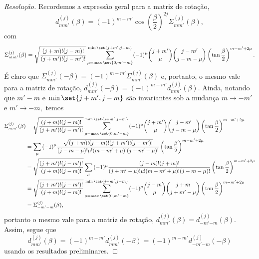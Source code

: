 \begin{proof}[Resolução]
   Recordemos a expressão geral para a matriz de rotação,
   \begin{equation*}
      d^{(j)}_{mm'}(\beta) = (-1)^{m - m'}  \cos\left(\frac\beta2\right)^{2j} \Sigma^{(j)}_{mm'}(\beta),
   \end{equation*}
   com
   \begin{equation*}
      \Sigma^{(j)}_{mm'}(\beta) = \sqrt{\frac{(j+m)!(j-m)!}{(j + m')!(j - m')!}}\sum_{\mu = \max\set{0,m' - m}}^{\min\set{j+m', j-m}} (-1)^\mu \binom{j + m'}{\mu}\binom{j - m'}{j - m - \mu}\left(\tan\frac\beta2\right)^{m - m' + 2\mu}.
   \end{equation*}
   É claro que \(\Sigma^{(j)}_{mm'}(-\beta) = (-1)^{m - m'} \Sigma^{(j)}_{mm'}(\beta)\) e, portanto, o mesmo vale para a matriz de rotação, \(d^{(j)}_{mm'}(-\beta) = (-1)^{m - m'} d^{(j)}_{mm'}(\beta).\) Ainda, notando que \(m' - m\) e \(\min\set{j+m',j-m}\) são invariantes sob a mudança \(m \to -m'\) e \(m' \to -m,\) temos
   \begin{align*}
      \Sigma^{(j)}_{mm'}(\beta) &= \sqrt{\frac{(j+m)!(j-m)!}{(j + m')!(j - m')!}}\sum_{\mu = \max\set{0,m' - m}}^{\min\set{j+m', j-m}} (-1)^\mu \binom{j + m'}{\mu}\binom{j - m'}{j - m - \mu}\left(\tan\frac\beta2\right)^{m - m' + 2\mu}\\
                                &= \sum_{\mu}{(-1)^\mu \frac{\sqrt{(j+m)!(j - m)!(j+m')!(j-m')!}}{(j - m - \mu)!\mu!(m - m' + \mu)!(j + m' - \mu)!}\left(\tan\frac\beta2\right)^{m - m' + 2\mu}}\\
                                &=\sqrt{\frac{(j+m')!(j-m')!}{(j + m)!(j - m)!}}\sum_{\mu}{(-1)^\mu \frac{(j - m)!(j + m)!}{(j + m' - \mu)!\mu! (m - m' + \mu)!(j - m - \mu)!}\left(\tan\frac\beta2\right)^{m - m' + 2\mu}}\\
                                &= \sqrt{\frac{(j+m')!(j-m')!}{(j + m)!(j - m)!}}\sum_{\mu = \max\set{0,m' - m}}^{\min\set{j+m', j-m}} (-1)^\mu \binom{j - m}{\mu}\binom{j + m}{j + m' - \mu}\left(\tan\frac\beta2\right)^{m - m' + 2\mu}\\
                                &= \Sigma^{(j)}_{-m'{-m}}(\beta),
   \end{align*}
   portanto o mesmo vale para a matriz de rotação, \(d^{(j)}_{mm'}(\beta) = d^{(j)}_{-m'{-m}}(\beta).\) Assim, segue que 
   \begin{equation*}
      d^{(j)}_{mm'}(\beta) = (-1)^{m - m'} d^{(j)}_{mm'}(-\beta) = (-1)^{m - m'} d^{(j)}_{-m'{-m}}(-\beta)
   \end{equation*}
   usando os resultados preliminares.


\end{proof}
